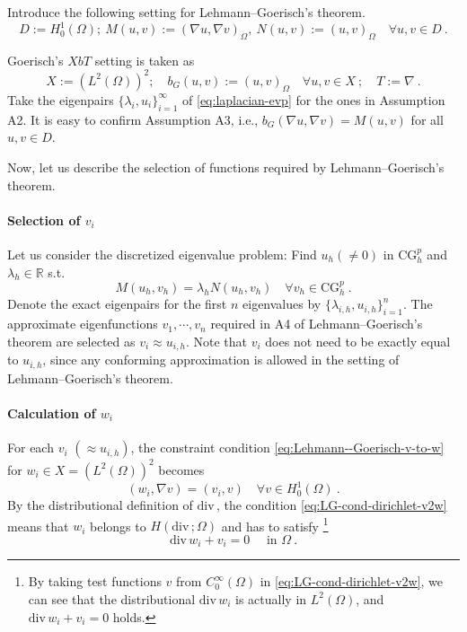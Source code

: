 \documentclass[a4,11pt]{article}
\numberwithin{equation}{section}
\newcommand{\Div}{\mbox{div}\mspace{3mu}}
\begin{document}
Introduce 
the following setting for  Lehmann--Goerisch's theorem.
$$
D:=H^1_0(\Omega); ~
M(u,v) :=(\nabla u, \nabla v)_\Omega,~
N(u,v):=(u, v)_\Omega\quad \forall u,v \in D\:.
$$

Goerisch's $XbT$ setting is taken as 
$$
X:=\left(L^2(\Omega)\right)^2; \quad 
b_G(u,v) := (u,v)_\Omega \quad \forall u,v\in X~;\quad T:=\nabla~.
$$
Take the eigenpairs $\{\lambda_i, u_i\}_{i=1}^\infty$ of \eqref{eq:laplacian-evp} for the ones 
in Assumption A2.
It is easy to confirm Assumption A3, i.e., $b_G(\nabla u, \nabla v)=M(u, v)$ for all $u,v\in {D}$.

\medskip

Now, let us describe the selection of functions required by Lehmann--Goerisch's theorem.  
 
\paragraph{Selection of $v_i$}
 Let us consider the discretized eigenvalue problem: Find $u_h(\not = 0)$ in $\text{CG}^p_h$ and 
$\lambda_h \in \mathbb{R}$ s.t.
\begin{equation}
\label{eq:eig-h-laplacian-cg-p}	
M(u_h, v_h) = \lambda_{h} N(u_h, v_h)\quad \forall v_h \in \text{CG}^p_h~.
\end{equation}
Denote the exact eigenpairs for the first $n$ eigenvalues by $\{\lambda_{i,h}, u_{i,h}\}_{i=1}^{n}$. 
The approximate eigenfunctions $v_1, \cdots, v_n$ required in A4 of Lehmann--Goerisch's theorem are selected as $v_i \approx u_{i,h}$. Note that $v_i$ does not need to be exactly equal to $u_{i,h}$, since any conforming approximation is allowed in the setting of  Lehmann--Goerisch's theorem. 


\paragraph{Calculation of $w_i$}
%
{For each  $v_i$ $(\approx u_{i,h})$}, the constraint condition \eqref{eq:Lehmann--Goerisch-v-to-w} for $w_i \in X=(L^2(\Omega))^2$ becomes
\begin{equation}
\label{eq:LG-cond-dirichlet-v2w}
(w_i , \nabla v)= (v_i, v) \quad \forall v\in H^1_0(\Omega)\:.
\end{equation}
By the distributional definition of $\Div $, 
the condition \eqref{eq:LG-cond-dirichlet-v2w} means that $w_i$ belongs to $H(\Div;\Omega)$ and has to satisfy  \footnote{
By taking test functions $v$ from $C_0^\infty(\Omega)$ in \eqref{eq:LG-cond-dirichlet-v2w}, we can see that the distributional $\Div w_i$ is actually in $L^2(\Omega)$,
and $\Div w_i + v_{i} =0$ holds.
} 
\begin{equation}
	\label{eq:LG-cond-dirichlet-v2w-ph}
\Div w_i +v_{i}=0\quad \text{ in } \Omega~.	
\end{equation}
\end{document}
